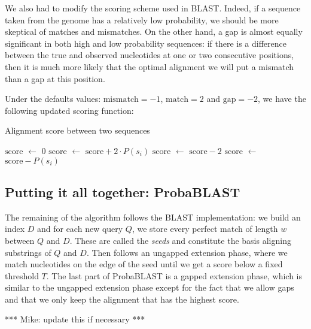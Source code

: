 \documentclass[12pt]{article}%
\newcommand*\Let[2]{\State #1 $\gets$ #2}
\begin{document}
We also had to modify the scoring scheme used in BLAST. Indeed, if a sequence taken from the genome has a relatively low probability, we should be more skeptical of matches and mismatches. On the other hand, a gap is almost equally significant in both high and low probability sequences: if there is a difference between the true and observed nucleotides at one or two consecutive positions, then it is much more likely that the optimal alignment we will put a mismatch than a gap at this position.

Under the defaults values: $\text{mismatch}= -1$, $\text{match}= 2$ and $\text{gap} = -2$, we have the following updated scoring function:

\begin{algorithm}
  \caption{Alignment score between two sequences
    \label{alg:score}}
  \begin{algorithmic}[1]
    \Statex
      \Let{$\text{score}$}{$0$}
          	\Let{$\text{score}$}{$\text{score} + 2\cdot P(s_i)$}
		\Let{$\text{score}$}{$\text{score} - 2$}
	\Else 
		\Let{$\text{score}$}{$\text{score} - P(s_i)$}
        \EndIf
      \EndFor
      \State {}
    \EndFunction
  \end{algorithmic}
\end{algorithm}



\subsection{Putting it all together: ProbaBLAST}

The remaining of the algorithm follows the BLAST implementation: we build an index $D$ and for each new query $Q$, we store every perfect match of length $w$ between $Q$ and $D$. These are called the \emph{seeds} and constitute the basis aligning substrings of $Q$ and $D$. Then follows an ungapped extension phase, where we match nucleotides on the edge of the seed until we get a score below a fixed threshold $T$. 
The last part of ProbaBLAST is a gapped extension phase, which is similar to the ungapped extension phase except for the fact that we allow gaps and that we only keep the alignment that has the highest score. 

*** Mike: update this if necessary ***
\end{document}
